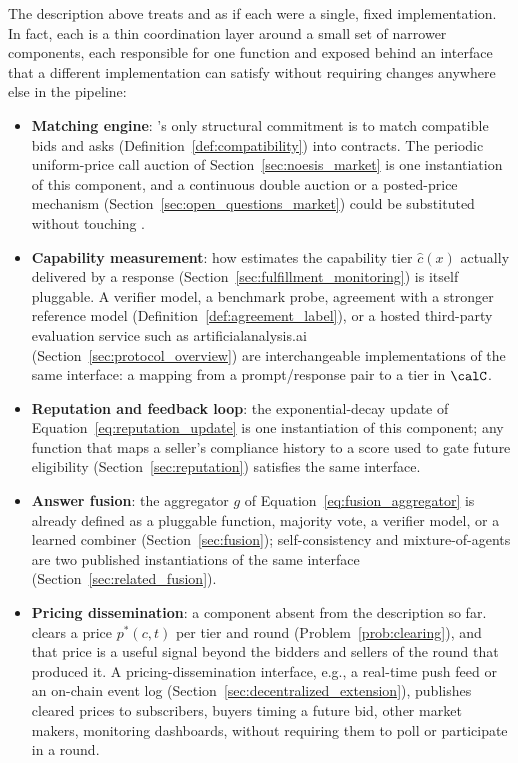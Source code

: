 The description above treats \NoesisMarket{} and \NoesisServer{} as if each
were a single, fixed implementation. In fact, each is a thin coordination
layer around a small set of narrower components, each responsible for one
function and exposed behind an interface that a different implementation
can satisfy without requiring changes anywhere else in the pipeline:

\begin{itemize}
  \item \textbf{Matching engine}: \NoesisMarket's only structural
    commitment is to match compatible bids and asks
    (Definition~\ref{def:compatibility}) into contracts. The periodic
    uniform-price call auction of Section~\ref{sec:noesis_market} is one
    instantiation of this component, and a continuous double auction or a
    posted-price mechanism (Section~\ref{sec:open_questions_market}) could be
    substituted without touching \NoesisServer.

  \item \textbf{Capability measurement}: how \NoesisServer{} estimates the
    capability tier $\hat c(x)$ actually delivered by a response
    (Section~\ref{sec:fulfillment_monitoring}) is itself pluggable. A
    verifier model, a benchmark probe, agreement with a stronger reference
    model (Definition~\ref{def:agreement_label}), or a hosted third-party
    evaluation service such as artificialanalysis.ai
    (Section~\ref{sec:protocol_overview}) are interchangeable
    implementations of the same interface: a mapping from a prompt/response
    pair to a tier in $\calC$.

  \item \textbf{Reputation and feedback loop}: the exponential-decay update
    of Equation~\eqref{eq:reputation_update} is one instantiation of this
    component; any function that maps a seller's compliance history to a
    score used to gate future eligibility (Section~\ref{sec:reputation})
    satisfies the same interface.

  \item \textbf{Answer fusion}: the aggregator $g$ of
    Equation~\eqref{eq:fusion_aggregator} is already defined as a pluggable
    function, majority vote, a verifier model, or a learned combiner
    (Section~\ref{sec:fusion}); self-consistency \cite{wang2022selfconsistency}
    and mixture-of-agents \cite{wang2024moa} are two published
    instantiations of the same interface (Section~\ref{sec:related_fusion}).

  \item \textbf{Pricing dissemination}: a component absent from the
    description so far. \NoesisMarket{} clears a price $p^*(c, t)$ per tier
    and round (Problem~\ref{prob:clearing}), and that price is a useful
    signal beyond the bidders and sellers of the round that produced it. A
    pricing-dissemination interface, e.g., a real-time push feed or an
    on-chain event log (Section~\ref{sec:decentralized_extension}),
    publishes cleared prices to subscribers, buyers timing a future bid,
    other market makers, monitoring dashboards, without requiring them to
    poll \NoesisMarket{} or participate in a round.
\end{itemize}

